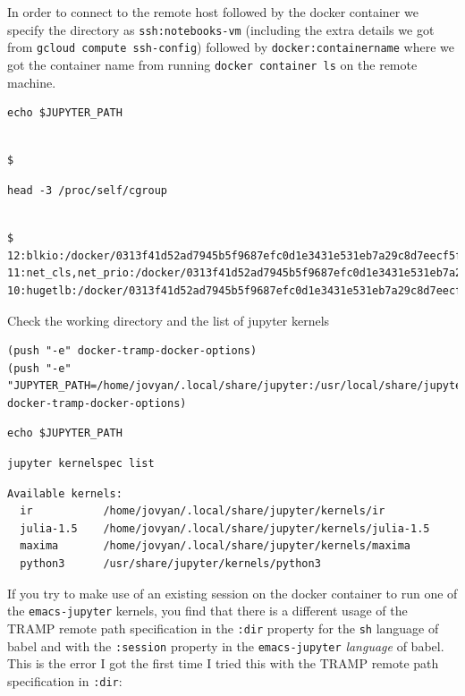 \documentclass[11pt]{article}
\begin{document}
In order to connect to the remote host followed by the docker container we specify the directory as \texttt{ssh:notebooks-vm} (including the extra details we got from \texttt{gcloud compute ssh-config}) followed by \texttt{docker:containername} where we got the container name from running \texttt{docker container ls} on the remote machine.

\begin{verbatim}
echo $JUPYTER_PATH
\end{verbatim}

\begin{verbatim}

$
\end{verbatim}


\begin{verbatim}
head -3 /proc/self/cgroup
\end{verbatim}

\begin{verbatim}

$ 12:blkio:/docker/0313f41d52ad7945b5f9687efc0d1e3431e531eb7a29c8d7eecf5fddcbef0f93
11:net_cls,net_prio:/docker/0313f41d52ad7945b5f9687efc0d1e3431e531eb7a29c8d7eecf5fddcbef0f93
10:hugetlb:/docker/0313f41d52ad7945b5f9687efc0d1e3431e531eb7a29c8d7eecf5fddcbef0f93
\end{verbatim}


Check the working directory and the list of jupyter kernels
\begin{verbatim}
(push "-e" docker-tramp-docker-options)
(push "-e" "JUPYTER_PATH=/home/jovyan/.local/share/jupyter:/usr/local/share/jupyter:/usr/share/jupyter" docker-tramp-docker-options)
\end{verbatim}

\begin{verbatim}
echo $JUPYTER_PATH
\end{verbatim}

\begin{verbatim}
jupyter kernelspec list
\end{verbatim}

\begin{verbatim}
Available kernels:
  ir           /home/jovyan/.local/share/jupyter/kernels/ir
  julia-1.5    /home/jovyan/.local/share/jupyter/kernels/julia-1.5
  maxima       /home/jovyan/.local/share/jupyter/kernels/maxima
  python3      /usr/share/jupyter/kernels/python3
\end{verbatim}


If you try to make use of an existing session on the docker container to run one of the \texttt{emacs-jupyter} kernels, you find that there is a different usage of the TRAMP remote path specification in the \texttt{:dir} property for the \texttt{sh} language of babel and with the \texttt{:session} property in the \texttt{emacs-jupyter} \emph{language} of babel. This is the error I got the first time I tried this with the TRAMP remote path specification in \texttt{:dir}:
\end{document}
